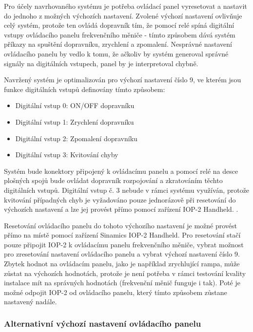 Pro účely navrhovaného systému je potřeba ovládací panel vyresetovat a nastavit do jednoho z  možných výchozích nastavení. Zvolené výchozí nastavení ovlivňuje celý systém, protože ten ovládá dopravník tím, že pomocí relé spíná digitální vstupy ovládacího panelu frekvenčního měniče - tímto způsobem dává systém příkazy na spuštění dopravníku, zrychlení a zpomalení. Nesprávné nastavení ovládacího panelu by vedlo k tomu, že ačkoliv by systém generoval správné signály na digitálních vstupech, panel by je interpretoval chybně.

Navržený systém je optimalizován pro výchozí nastavení číslo 9, ve kterém jsou funkce digitálních vstupů definovány tímto způsobem:
\begin{itemize}
	\item Digitální vstup 0: ON/OFF dopravníku
	\item Digitální vstup 1: Zrychlení dopravníku
	\item Digitální vstup 2: Zpomalení dopravníku
	\item Digitální vstup 3: Kvitování chyby
\end{itemize}
Systém bude konektory připojený k ovládacímu panelu a pomocí relé na desce plošných spojů bude ovládat dopravník rozpojování a zkratováním těchto digitálních vstupů. Digitální vstup č. 3 nebude v rámci systému využíván, protože kvitování případných chyb je vyžadováno pouze jednorázově při resetování do výchozích nastavení a lze jej provést přímo pomocí zařízení IOP-2 Handheld.
\cite{SiemensG120DGettingStarted}.

Resetování ovládacího panelu do tohoto výchozího nastavení je možné provést přímo na místě pomocí zařízení Sinamics IOP-2 Handheld. Pro resetování stačí pouze připojit IOP-2 k ovládacímu panelu frekvenčního měniče, vybrat možnost pro zresetování nastavení ovládacího panelu a vybrat výchozí nastavení číslo 9. Zbytek hodnot na ovládacím panelu, jako je například zrychlující rampa, může zůstat na výchozích hodnotách, protože je není potřeba v rámci testování kvality instalace mít na správných hodnotách (frekvenční měnič funguje i tak). Poté je možné odpojit IOP-2 od ovládacího panelu, který tímto způsobem zůstane nastavený nadále.



\subsubsection{Alternativní výchozí nastavení ovládacího panelu}

